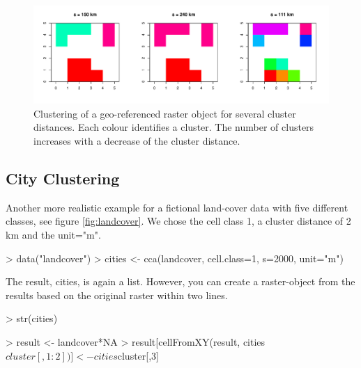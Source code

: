 \documentclass[10pt,a4paper]{article}
\begin{document}
\begin{figure}
\centering
\includegraphics[width=\textwidth]{pics/raster.pdf}
\caption{Clustering of a geo-referenced raster object for several cluster distances. Each colour identifies a cluster. The number of clusters increases with a decrease of the cluster distance.}
\label{fig:raster}
\end{figure}

\subsection{City Clustering}
Another more realistic example for a fictional land-cover data with five different classes, see figure \ref{fig:landcover}. We chose the cell class 1, a cluster distance of 2 km and the unit="m".

\begin{Schunk}
\begin{Sinput}
> data("landcover")
> cities <- cca(landcover, cell.class=1, s=2000, unit="m")
\end{Sinput}
\end{Schunk}

The result, cities, is again a list. However, you can create a raster-object from the results based on the original raster within two lines.

\begin{Schunk}
\begin{Sinput}
> str(cities)
\end{Sinput}
\begin{Sinput}
> result <- landcover*NA
> result[cellFromXY(result, cities$cluster[,1:2])] <- cities$cluster[,3]
\end{Sinput}
\end{Schunk}
\end{document}
